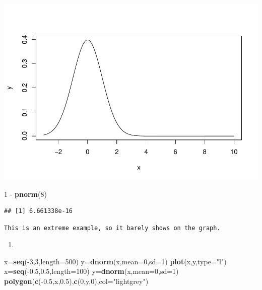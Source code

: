 \documentclass[]{article}
\newenvironment{Shaded}{\begin{snugshade}}{\end{snugshade}}
\newcommand{\KeywordTok}[1]{\textcolor[rgb]{0.13,0.29,0.53}{\textbf{{#1}}}}
\newcommand{\DataTypeTok}[1]{\textcolor[rgb]{0.13,0.29,0.53}{{#1}}}
\newcommand{\DecValTok}[1]{\textcolor[rgb]{0.00,0.00,0.81}{{#1}}}
\newcommand{\FloatTok}[1]{\textcolor[rgb]{0.00,0.00,0.81}{{#1}}}
\newcommand{\StringTok}[1]{\textcolor[rgb]{0.31,0.60,0.02}{{#1}}}
\newcommand{\NormalTok}[1]{{#1}}
\begin{document}
\includegraphics{DATA_606_-_Homework_3_files/figure-latex/unnamed-chunk-3-1.pdf}

\begin{Shaded}
\begin{Highlighting}[]
\DecValTok{1} \NormalTok{-}\StringTok{ }\KeywordTok{pnorm}\NormalTok{(}\DecValTok{8}\NormalTok{)}
\end{Highlighting}
\end{Shaded}

\begin{verbatim}
## [1] 6.661338e-16
\end{verbatim}

\begin{verbatim}
This is an extreme example, so it barely shows on the graph.
\end{verbatim}

\begin{enumerate}
\def\labelenumi{(\alph{enumi})}
\setcounter{enumi}{3}
\item
\end{enumerate}

\begin{Shaded}
\begin{Highlighting}[]
\NormalTok{x=}\KeywordTok{seq}\NormalTok{(-}\DecValTok{3}\NormalTok{,}\DecValTok{3}\NormalTok{,}\DataTypeTok{length=}\DecValTok{500}\NormalTok{)}
\NormalTok{y=}\KeywordTok{dnorm}\NormalTok{(x,}\DataTypeTok{mean=}\DecValTok{0}\NormalTok{,}\DataTypeTok{sd=}\DecValTok{1}\NormalTok{)}
\KeywordTok{plot}\NormalTok{(x,y,}\DataTypeTok{type=}\StringTok{"l"}\NormalTok{)}
\NormalTok{x=}\KeywordTok{seq}\NormalTok{(-}\FloatTok{0.5}\NormalTok{,}\FloatTok{0.5}\NormalTok{,}\DataTypeTok{length=}\DecValTok{100}\NormalTok{)}
\NormalTok{y=}\KeywordTok{dnorm}\NormalTok{(x,}\DataTypeTok{mean=}\DecValTok{0}\NormalTok{,}\DataTypeTok{sd=}\DecValTok{1}\NormalTok{)}
\KeywordTok{polygon}\NormalTok{(}\KeywordTok{c}\NormalTok{(-}\FloatTok{0.5}\NormalTok{,x,}\FloatTok{0.5}\NormalTok{),}\KeywordTok{c}\NormalTok{(}\DecValTok{0}\NormalTok{,y,}\DecValTok{0}\NormalTok{),}\DataTypeTok{col=}\StringTok{"lightgrey"}\NormalTok{)}
\end{Highlighting}
\end{Shaded}
\end{document}
